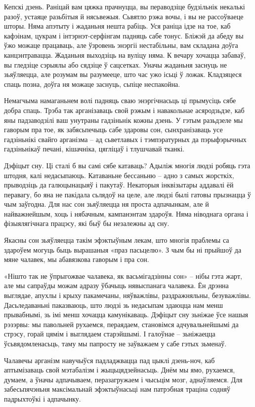 Кепскі дзень. Раніцай вам цяжка прачнуцца, вы пераводзіце будзільнік некалькі разоў, устаяце разьбітыя й нясьвежыя. Сьвятло рэжа вочы, і вы не рассоўваеце шторы. Няма апэтыту і жаданьня нешта рабіць. Уся раніца ідзе на тое, каб кафэінам, цукрам і інтэрнэт-серфінгам падняць сабе тонус. Бліжэй да абеду вы ўжо можаце працаваць, але ўзровень энэргіі нестабільны, вам складана доўга канцэнтравацца. Жаданьня выходзіць на вуліцу няма. К вечару хочацца забаваў, вы гледзіце сэрыялы або сядзіце ў сацсетках. Уначы жаданьня заснуць не зьяўляецца, але розумам вы разумееце, што час ужо ісьці ў ложак. Кладзяцеся спаць позна, доўга ня можаце заснуць, сьпіце неспакойна.

Немагчыма намаганьнем волі падняць сваю энэргічнасьць ці прымусіць сябе добра спаць. Трэба так арганізаваць свой рэжым і навакольнае асяродзьдзе, каб яны падзаводзілі ваш унутраны гадзіньнік кожны дзень. У гэтым разьдзеле мы гаворым пра тое, як забясьпечыць сабе здаровы сон, сынхранізаваць усе гадзіньнікі свайго арганізма – ад сьветлавых і тэмпэратурных да пэрыфэрычных гадзіньнікаў печані, кішачніка, цягліцаў і тлушчавай тканкі.

Дэфіцыт сну. Ці сталі б вы самі сябе катаваць? Адыліж многія людзі робяць гэта штодня, калі недасыпаюць. Катаваньне бессаньню – адно з самых жорсткіх, прыводзіць да галюцынацыяў і пакутаў. Некаторыя інквізытары аддавалі ёй перавагу, бо яна не пакідала сьлядоў на целе, але людзі былі гатовы прызнацца ў чым заўгодна. Для нас сон зьяўляецца ня проста адпачынкам, але й найважнейшым, хоць і нябачным, кампанэнтам здароўя. Няма ніводнага органа і фізыялягічнага працэсу, які быў бы незалежны ад сну. 

Якасны сон зьяўляецца такім эфэктыўным лекам, што многія праблемы са здароўем могуць быць вырашаныя «праз пасьцелю». З чым бы ні прыйшоў да мяне чалавек, мы абавязкова гаворым і пра сон.

«Нішто так не ўпрыгожвае чалавека, як васьмігадзінны сон» – нібы гэта жарт, але мы сапраўды можам адразу ўбачыць нявыспанага чалавека. Ён дрэнна выглядае, апухлы і крыху пакамечаны, няўважлівы, раздражняльны, безуважлівы. Дасьледаваньні паказваюць, што людзі зь недасыпам здаюцца нам менш прывабнымі, зь імі менш хочацца камунікаваць. Дэфіцыт сну зьніжае ўсе нашыя рэзэрвы: мы павольней рухаемся, пераядаем, становімся адчувальнейшымі да стрэсу, горай цямім і выглядаем старэйшымі. І галоўнае – зьніжаецца ўсьвядомленасьць, таму мы папросту не заўважаем у сабе гэтых зьменаў.

Чалавечы арганізм навучыўся падладжвацца пад цыклі дзень-ноч, каб аптымізаваць свой мэтабалізм і жыцьцядзейнасьць. Днём мы ямо, рухаемся, думаем, а ўначы адпачываем, перазагружаем і чысьцім мозг, аднаўляемся. Для забесьпячэньня максімальнай эфэктыўнасьці нам патрэбная траціна содняў падрыхтоўкі і адпачынку.

